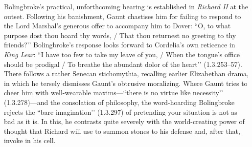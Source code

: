 Bolingbroke’s practical, unforthcoming bearing is established in \emph{Richard II} at the outset.
Following his banishment, Gaunt chastises him for failing to respond to the Lord Marshal’s generous offer to accompany him to Dover: ``O, to what purpose dost thou hoard thy words, / That thou returnest no greeting to thy friends?’’ Bolingbroke’s response looks forward to Cordelia’s own reticence in \emph{King Lear}: ``I have too few to take my leave of you, / When the tongue’s office should be prodigal / To breathe the abundant dolor of the heart’’ (1.3.253--57).
There follows a rather Senecan stichomythia, recalling earlier Elizabethan drama, in which he tersely dismisses Gaunt’s obtrusive moralizing.
Where Gaunt tries to cheer him with well-wearable maxims---``there is no virtue like necessity’’ (1.3.278)---and the consolation of philosophy, the word-hoarding Bolingbroke rejects the ``bare imagination’’ (1.3.297) of pretending your situation is not as bad as it is.
In this, he contrasts quite severely with the world-creating power of thought that Richard will use to summon stones to his defense and, after that, invoke in his cell.

